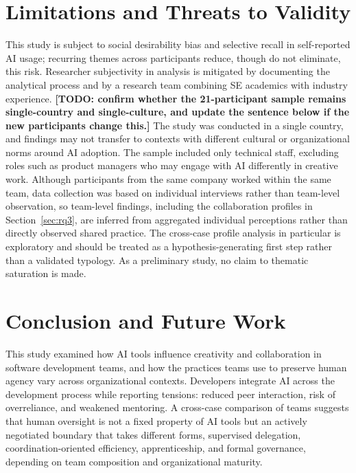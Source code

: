 \documentclass[10pt,journal,compsoc]{IEEEtran}
\begin{document}
\section{Limitations and Threats to Validity}

This study is subject to social desirability bias and selective recall in self-reported AI usage; recurring themes across participants reduce, though do not eliminate, this risk. Researcher subjectivity in analysis is mitigated by documenting the analytical process and by a research team combining SE academics with industry experience. \textbf{[TODO: confirm whether the 21-participant sample remains single-country and single-culture, and update the sentence below if the new participants change this.]} The study was conducted in a single country, and findings may not transfer to contexts with different cultural or organizational norms around AI adoption. The sample included only technical staff, excluding roles such as product managers who may engage with AI differently in creative work. Although participants from the same company worked within the same team, data collection was based on individual interviews rather than team-level observation, so team-level findings, including the collaboration profiles in Section~\ref{sec:rq3}, are inferred from aggregated individual perceptions rather than directly observed shared practice. The cross-case profile analysis in particular is exploratory and should be treated as a hypothesis-generating first step rather than a validated typology. As a preliminary study, no claim to thematic saturation is made.

\section{Conclusion and Future Work}

This study examined how AI tools influence creativity and collaboration in software development teams, and how the practices teams use to preserve human agency vary across organizational contexts. Developers integrate AI across the development process while reporting tensions: reduced peer interaction, risk of overreliance, and weakened mentoring. A cross-case comparison of teams suggests that human oversight is not a fixed property of AI tools but an actively negotiated boundary that takes different forms, supervised delegation, coordination-oriented efficiency, apprenticeship, and formal governance, depending on team composition and organizational maturity.
\end{document}
